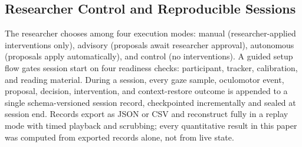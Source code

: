 \subsection{Researcher Control and Reproducible Sessions}

The researcher chooses among four execution modes: manual (researcher-applied interventions only), advisory (proposals await researcher approval), autonomous (proposals apply automatically), and control (no interventions).
A guided setup flow gates session start on four readiness checks: participant, tracker, calibration, and reading material.
During a session, every gaze sample, oculomotor event, proposal, decision, intervention, and context-restore outcome is appended to a single schema-versioned session record, checkpointed incrementally and sealed at session end.
Records export as JSON or CSV and reconstruct fully in a replay mode with timed playback and scrubbing; every quantitative result in this paper was computed from exported records alone, not from live state.
